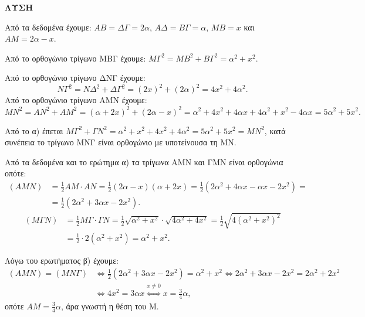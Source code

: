 \textbf{ΛΥΣΗ}

Από τα δεδομένα έχουμε: $ΑΒ = ΔΓ = 2α$, $ΑΔ = ΒΓ = α$, $ΜΒ = x$ και $ΑΜ = 2α - x$.

\begin{alist}
    \item Από το ορθογώνιο τρίγωνο ΜΒΓ έχουμε: $ΜΓ^2 = ΜΒ^2 + ΒΓ^2 = α^2 + x^2$.
    
    Από το ορθογώνιο τρίγωνο ΔΝΓ έχουμε:
    \[ ΝΓ^2 = ΝΔ^2 + ΔΓ^2 = (2x)^2 + (2α)^2 = 4x^2 + 4α^2. \]
    Από το ορθογώνιο τρίγωνο ΑΜΝ έχουμε:
    \[ ΜΝ^2 = ΑΝ^2 + ΑΜ^2 = (α + 2x)^2 + (2α - x)^2 = α^2 + 4x^2 + 4αx + 4α^2 + x^2 - 4αx = 5α^2 + 5x^2. \]

    \item Από το α) έπεται $ΜΓ^2 + ΓΝ^2 = α^2 + x^2 + 4x^2 + 4α^2 = 5α^2 + 5x^2 = ΜΝ^2$, κατά συνέπεια το τρίγωνο ΜΝΓ είναι ορθογώνιο με υποτείνουσα τη ΜΝ.

    \item Από τα δεδομένα και το ερώτημα α) τα τρίγωνα ΑΜΝ και ΓΜΝ είναι ορθογώνια οπότε:
    \begin{align*}
        (ΑΜΝ) &= \frac{1}{2} ΑΜ \cdot ΑΝ = \frac{1}{2} (2α - x)(α + 2x) = \frac{1}{2} (2α^2 + 4αx - αx - 2x^2) = \\
        &= \frac{1}{2} (2α^2 + 3αx - 2x^2).
    \end{align*}
    \begin{align*}
        (ΜΓΝ) &= \frac{1}{2} ΜΓ \cdot ΓΝ = \frac{1}{2} \sqrt{α^2 + x^2} \cdot \sqrt{4α^2 + 4x^2} = \frac{1}{2} \sqrt{4(α^2 + x^2)^2} \\
        &= \frac{1}{2} \cdot 2 (α^2 + x^2) = α^2 + x^2.
    \end{align*}

    \item Λόγω του ερωτήματος β) έχουμε:
    \begin{align*}
        (ΑΜΝ) = (ΜΝΓ) &\iff \frac{1}{2} (2α^2 + 3αx - 2x^2) = α^2 + x^2 \iff 2α^2 + 3αx - 2x^2 = 2α^2 + 2x^2 \\
        &\iff 4x^2 = 3αx \stackrel{x \neq 0}{\iff} x = \frac{3}{4} α,
    \end{align*}
    οπότε $ΑΜ = \frac{3}{4} α$, άρα γνωστή η θέση του Μ.
\end{alist}